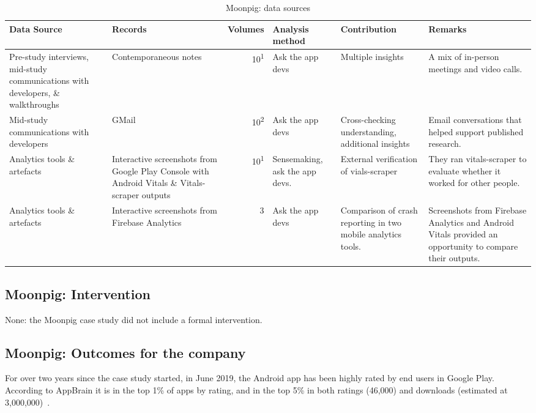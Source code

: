 \begin{table*}
    \centering
    \footnotesize
    \tabcolsep=0.12cm
    \begin{tabular}{p{2.6cm}p{2.9cm}r>{\raggedright}p{2.1cm}>{\raggedright\arraybackslash}p{2.5cm}>{\raggedright\arraybackslash}p{3cm}}
        Data Source & Records & Volumes & Analysis method & Contribution & Remarks \\
        \toprule
         Pre-study interviews, mid-study communications with developers, \& walkthroughs & Contemporaneous notes & 10\textsuperscript{1} & Ask the app devs & Multiple insights & A mix of in-person meetings and video calls.  \\
         Mid-study communications with developers & GMail & 10\textsuperscript{2} & Ask the app devs & Cross-checking understanding, additional insights & Email conversations that helped support published research. \\
         Analytics tools \& artefacts &Interactive screenshots from Google Play Console with Android Vitals \& Vitals-scraper outputs &10\textsuperscript{1} & Sensemaking, ask the app devs. & External verification of vials-scraper & They ran vitals-scraper to evaluate whether it worked for other people. \\
         Analytics tools \& artefacts & Interactive screenshots from Firebase Analytics & 3 & Ask the app devs & Comparison of crash reporting in two mobile analytics tools. & Screenshots from Firebase Analytics and Android Vitals provided an opportunity to compare their outputs. \\
         \bottomrule
    \end{tabular}
    \caption{Moonpig: data sources}
    \label{tab:moonpig-data-sources}
\end{table*}


\subsection{Moonpig: Intervention}
None: the Moonpig case study did not include a formal intervention.

\subsection{Moonpig: Outcomes for the company}
For over two years since the case study started, in June 2019, the Android app has been highly rated by end users in Google Play. According to AppBrain it is in the top 1\% of apps by rating, and in the top 5\% in both ratings (46,000) and downloads (estimated at 3,000,000)~.


